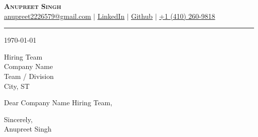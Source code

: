 \documentclass[letterpaper,11pt]{article}
\newcommand{\companyName}{Company Name}
\newcommand{\companyTeam}{Team / Division}
\newcommand{\companyCity}{City, ST}
\begin{document}
\begin{center}
    \textbf{\Huge \scshape Anupreet Singh} \\ \vspace{2pt}
    \small \href{mailto:anupreet2226579@gmail.com}{\underline{anupreet2226579@gmail.com}}
    $|$
    \href{https://www.linkedin.com/in/anupreet-singh-71b1861b8/}{\underline{LinkedIn}}
    $|$
    \href{https://github.com/anupreetsingh}{\underline{Github}}
    $|$
    \underline{+1 (410) 260-9818}
\end{center}

\vspace{4pt}
\hrule
\vspace{10pt}

\today

\vspace{4pt}
Hiring Team \\
\companyName \\
\companyTeam \\
\companyCity

Dear \companyName{} Hiring Team,






\vspace{6pt}
Sincerely, \\
Anupreet Singh
\end{document}
